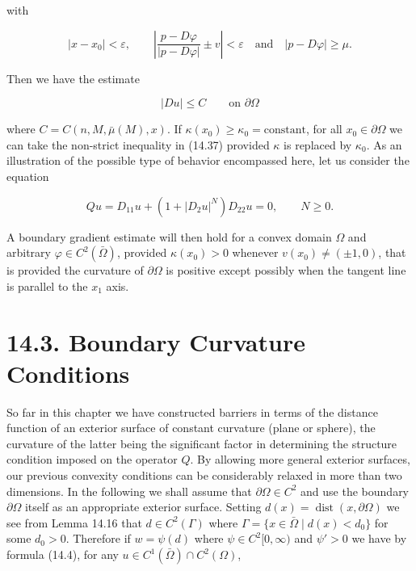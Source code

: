 
with

\[
\left|x-x_0\right|<\varepsilon,\qquad
\left|\frac{p-D\varphi}{\left|p-D\varphi\right|}\pm v\right|<\varepsilon
\quad\text{and}\quad
\left|p-D\varphi\right|\ge \mu.
\]

Then we have the estimate

\begin{equation}
\left|Du\right|\le C \qquad \text{on } \partial\Omega
\tag{14.38}
\end{equation}

where $C=C(n, M, \bar{\mu}(M), x)$. If $\kappa(x_0)\ge \kappa_0=\text{constant}$, for all $x_0\in\partial\Omega$ we can take the non-strict inequality in (14.37) provided $\kappa$ is replaced by $\kappa_0$. As an illustration of the possible type of behavior encompassed here, let us consider the equation

\begin{equation}
Qu=D_{11}u+\left(1+\left|D_2u\right|^N\right)D_{22}u=0,\qquad N\ge 0.
\tag{14.39}
\end{equation}

A boundary gradient estimate will then hold for a convex domain $\Omega$ and arbitrary $\varphi\in C^2(\bar{\Omega})$, provided $\kappa(x_0)>0$ whenever $v(x_0)\neq (\pm 1,0)$, that is provided the curvature of $\partial\Omega$ is positive except possibly when the tangent line is parallel to the $x_1$ axis.

\section*{14.3. Boundary Curvature Conditions}

So far in this chapter we have constructed barriers in terms of the distance function of an exterior surface of constant curvature (plane or sphere), the curvature of the latter being the significant factor in determining the structure condition imposed on the operator $Q$. By allowing more general exterior surfaces, our previous convexity conditions can be considerably relaxed in more than two dimensions. In the following we shall assume that $\partial\Omega\in C^2$ and use the boundary $\partial\Omega$ itself as an appropriate exterior surface. Setting $d(x)=\operatorname{dist}(x,\partial\Omega)$ we see from Lemma 14.16 that $d\in C^2(\Gamma)$ where $\Gamma=\{x\in\bar{\Omega}\mid d(x)<d_0\}$ for some $d_0>0$. Therefore if $w=\psi(d)$ where $\psi\in C^2[0,\infty)$ and $\psi'>0$ we have by formula (14.4), for any $u\in C^1(\bar{\Omega})\cap C^2(\Omega)$,

